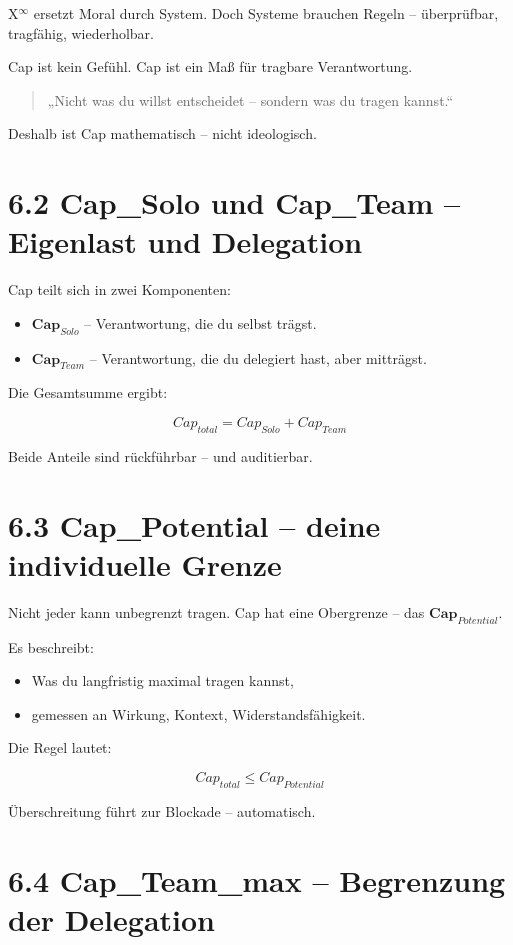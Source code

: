 \documentclass[12pt,a4paper]{book}
\begin{document}
X$^\infty$ ersetzt Moral durch System.  
Doch Systeme brauchen Regeln – überprüfbar, tragfähig, wiederholbar.

Cap ist kein Gefühl.  
Cap ist ein Maß für tragbare Verantwortung.

\begin{quote}
„Nicht was du willst entscheidet – sondern was du tragen kannst.“  
\end{quote}

Deshalb ist Cap mathematisch – nicht ideologisch.

\section*{6.2 Cap\_Solo und Cap\_Team – Eigenlast und Delegation}

Cap teilt sich in zwei Komponenten:

\begin{itemize}
    \item $\textbf{Cap}_{Solo}$ – Verantwortung, die du selbst trägst.
    \item $\textbf{Cap}_{Team}$ – Verantwortung, die du delegiert hast, aber mitträgst.
\end{itemize}

Die Gesamtsumme ergibt:

\[
Cap_{total} = Cap_{Solo} + Cap_{Team}
\]

Beide Anteile sind rückführbar – und auditierbar.

\section*{6.3 Cap\_Potential – deine individuelle Grenze}

Nicht jeder kann unbegrenzt tragen.  
Cap hat eine Obergrenze – das $\textbf{Cap}_{Potential}$.

Es beschreibt:

\begin{itemize}
    \item Was du langfristig maximal tragen kannst,
    \item gemessen an Wirkung, Kontext, Widerstandsfähigkeit.
\end{itemize}

Die Regel lautet:

\[
Cap_{total} \leq Cap_{Potential}
\]

Überschreitung führt zur Blockade – automatisch.

\section*{6.4 Cap\_Team\_max – Begrenzung der Delegation}
\end{document}
